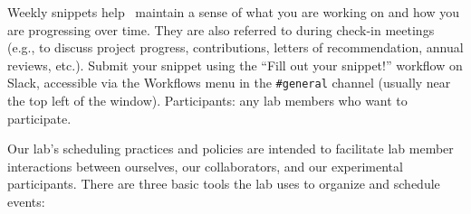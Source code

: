 \documentclass{tufte-book} %
\begin{document}
\begin{itemize}
Weekly snippets help \director~maintain a sense of what you are working on
and how you are progressing over time. They are also referred to
during check-in meetings (e.g., to discuss project progress,
contributions, letters of recommendation, annual reviews, etc.).
Submit your snippet using the ``Fill out your snippet!''
workflow on Slack, accessible via the Workflows menu in the \texttt{\#general}
channel (usually near the top left of the window).
Participants: any lab members who want to participate.
\end{itemize}


\label{sec: scheduling}

\noindent Our lab's scheduling practices and
policies are intended to facilitate lab member interactions between
ourselves, our collaborators, and our experimental participants.
There are three basic tools the lab uses to organize and schedule
events:
\end{document}
